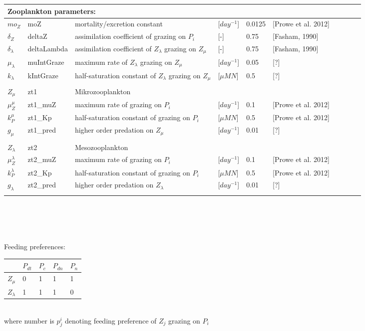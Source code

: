 \documentclass[letterpaper,10pt]{article}
\begin{document}
\begin{tabular}{llllllllll}
  \\
  \hline
  \multicolumn{3}{l}{Zooplankton parameters:} \\
  \hline
  $mo_Z$ & moZ &  mortality/excretion constant & [$day^{-1}$] & 0.0125 & [Prowe et al. 2012]\\
  $\delta_Z$ & deltaZ & assimilation coefficient of grazing on $P_i$ & [-] & 0.75 & [Fasham, 1990]\\
  $\delta_{\lambda}$ & deltaLambda & assimilation coefficient of $Z_{\lambda}$ grazing on $Z_{\mu}$ & [-] & 0.75 & [Fasham, 1990]\\ 
  $\mu_{\lambda}$ & muIntGraze & maximum rate of $Z_{\lambda}$ grazing on $Z_{\mu}$ & [$day^{-1}$] & 0.05 & [?]\\
  $k_{\lambda}$ & kIntGraze & half-saturation constant of $Z_{\lambda}$ grazing on $Z_{\mu}$ & [$\mu M N$] & 0.5 & [?]\\ 
  \\
  $Z_{\mu}$ & zt1 & Mikrozooplankton\\
  \hline
  $\mu^{\mu}_Z$ & zt1\_muZ & maximum rate of grazing on $P_i$ & [$day^{-1}$] & 0.1 & [Prowe et al. 2012]\\ 
  $k^{\mu}_P$ & zt1\_Kp  & half-saturation constant of grazing on $P_i$ & [$\mu M N$] & 0.5 & [Prowe et al. 2012]\\
  $g_{\mu}$ & zt1\_pred & higher order predation on $Z_{\mu}$ & [$day^{-1}$] & 0.01 & [?]\\  
  \\
  $Z_{\lambda}$ & zt2 & Mesozooplankton\\
  \hline
  $\mu^{\lambda}_Z$ & zt2\_muZ & maximum rate of grazing on $P_i$ & [$day^{-1}$] & 0.1 & [Prowe et al. 2012]\\ 
  $k^{\lambda}_P$ & zt2\_Kp  & half-saturation constant of grazing on $P_i$ & [$\mu M N$] & 0.5 & [Prowe et al. 2012]\\
  $g_{\lambda}$ & zt2\_pred & higher order predation on $Z_{\lambda}$ & [$day^{-1}$] & 0.01 & [?]\\
  \\
  
  \hline
  \hline
\end{tabular}
\\\\\\\\
Feeding preferences: \\
\noindent
\begin{tabular}{l|l|l|l|l}
 
  & $P_{dt}$ & $P_{c}$ & $P_{dn}$ & $P_{n}$\\
\hline
$Z_{\mu}$ & 0 & 1 & 1 & 1\\
\hline
$Z_{\lambda}$ & 1 & 1 & 1 & 0\\
\hline
\end{tabular}
\\
where number is $p^i_j$ denoting feeding preference of $Z_j$ grazing on $P_i$
\end{document}
